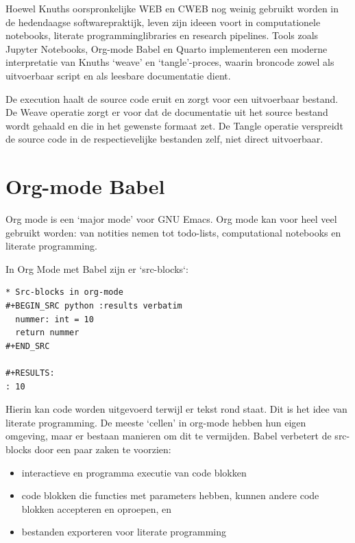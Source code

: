 Hoewel Knuths oorspronkelijke WEB en CWEB nog weinig gebruikt worden in de hedendaagse softwarepraktijk, leven zijn ideeen voort in computationele notebooks, literate programminglibraries en research pipelines. Tools zoals Jupyter Notebooks, Org-mode Babel en Quarto implementeren een moderne interpretatie van Knuths `weave' en `tangle'-proces, waarin broncode zowel als uitvoerbaar script en als leesbare documentatie dient.

De execution haalt de source code eruit en zorgt voor een uitvoerbaar bestand. De Weave operatie zorgt er voor dat de documentatie uit het source bestand wordt gehaald en die in het gewenste formaat zet. De Tangle operatie verspreidt de source code in de respectievelijke bestanden zelf, niet direct uitvoerbaar. \autocite{Knuth1984}

\section{Org-mode Babel}
Org mode is een `major mode' voor GNU Emacs.
Org mode kan voor heel veel gebruikt worden: van notities nemen tot todo-lists, computational notebooks en literate programming. \autocite{orgmode2025}

In Org Mode met Babel zijn er `src-blocks`:

\begin{verbatim}
* Src-blocks in org-mode
#+BEGIN_SRC python :results verbatim
  nummer: int = 10
  return nummer
#+END_SRC

#+RESULTS:
: 10
\end{verbatim}


Hierin kan code worden uitgevoerd terwijl er tekst rond staat.
Dit is het idee van literate programming.
De meeste `cellen' in org-mode hebben hun eigen omgeving, maar er bestaan manieren om dit te vermijden.
Babel verbetert de src-blocks door een paar zaken te voorzien:
\begin{itemize}
	\item interactieve en programma executie van code blokken
	\item code blokken die functies met parameters hebben, kunnen andere code blokken accepteren en oproepen, en
	\item bestanden exporteren voor literate programming
\end{itemize}

